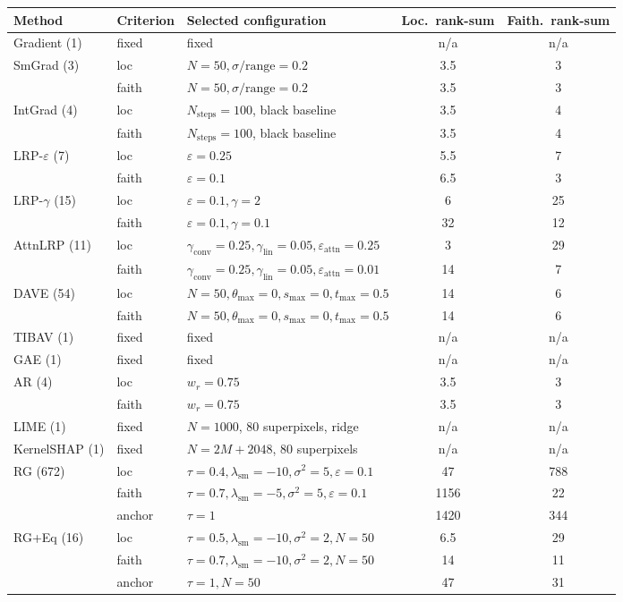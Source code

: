 \begin{tabular}{@{}l l l c c@{}}
\toprule
Method & Criterion & Selected configuration & Loc.\ rank-sum & Faith.\ rank-sum \\
\midrule
Gradient (1) & fixed & fixed & n/a & n/a \\
\addlinespace
SmGrad (3) & loc & $N{=}50,\sigma/\mathrm{range}{=}0.2$ & 3.5 & 3 \\
 & faith & $N{=}50,\sigma/\mathrm{range}{=}0.2$ & 3.5 & 3 \\
\addlinespace
IntGrad (4) & loc & $N_{\mathrm{steps}}{=}100$, black baseline & 3.5 & 4 \\
 & faith & $N_{\mathrm{steps}}{=}100$, black baseline & 3.5 & 4 \\
\addlinespace
LRP-$\varepsilon$ (7) & loc & $\varepsilon{=}0.25$ & 5.5 & 7 \\
 & faith & $\varepsilon{=}0.1$ & 6.5 & 3 \\
\addlinespace
LRP-$\gamma$ (15) & loc & $\varepsilon{=}0.1,\gamma{=}2$ & 6 & 25 \\
 & faith & $\varepsilon{=}0.1,\gamma{=}0.1$ & 32 & 12 \\
\addlinespace
AttnLRP (11) & loc & $\gamma_{\mathrm{conv}}{=}0.25,\gamma_{\mathrm{lin}}{=}0.05,\varepsilon_{\mathrm{attn}}{=}0.25$ & 3 & 29 \\
 & faith & $\gamma_{\mathrm{conv}}{=}0.25,\gamma_{\mathrm{lin}}{=}0.05,\varepsilon_{\mathrm{attn}}{=}0.01$ & 14 & 7 \\
\addlinespace
DAVE (54) & loc & $N{=}50,\theta_{\max}{=}0,s_{\max}{=}0,t_{\max}{=}0.5$ & 14 & 6 \\
 & faith & $N{=}50,\theta_{\max}{=}0,s_{\max}{=}0,t_{\max}{=}0.5$ & 14 & 6 \\
\addlinespace
TIBAV (1) & fixed & fixed & n/a & n/a \\
\addlinespace
GAE (1) & fixed & fixed & n/a & n/a \\
\addlinespace
AR (4) & loc & $w_r{=}0.75$ & 3.5 & 3 \\
 & faith & $w_r{=}0.75$ & 3.5 & 3 \\
\addlinespace
LIME (1) & fixed & $N{=}1000$, 80 superpixels, ridge & n/a & n/a \\
\addlinespace
KernelSHAP (1) & fixed & $N{=}2M{+}2048$, 80 superpixels & n/a & n/a \\
\addlinespace
RG (672) & loc & $\tau{=}0.4,\lambda_{\mathrm{sm}}{=}{-}10,\sigma^2{=}5,\varepsilon{=}0.1$ & 47 & 788 \\
 & faith & $\tau{=}0.7,\lambda_{\mathrm{sm}}{=}{-}5,\sigma^2{=}5,\varepsilon{=}0.1$ & 1156 & 22 \\
 & anchor & $\tau{=}1$ & 1420 & 344 \\
\addlinespace
RG+Eq (16) & loc & $\tau{=}0.5,\lambda_{\mathrm{sm}}{=}{-}10,\sigma^2{=}2,N{=}50$ & 6.5 & 29 \\
 & faith & $\tau{=}0.7,\lambda_{\mathrm{sm}}{=}{-}10,\sigma^2{=}2,N{=}50$ & 14 & 11 \\
 & anchor & $\tau{=}1,N{=}50$ & 47 & 31 \\
\bottomrule
\end{tabular}
